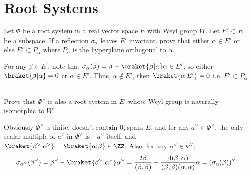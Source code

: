 \documentclass[11pt, headheight=30pt]{scrartcl}
\begin{document}






\section{Root Systems}
\begin{prob}
    Let $\Phi$ be a root system in a real vector space $E$ with Weyl group $W$.
    Let $E' \subset E$ be a subspace. If a reflection $\sigma_\alpha$ leaves $E'$ invariant, prove that either
    $\alpha \in E'$ or else $E' \subset P_\alpha$ where $P_\alpha$ is the hyperplane orthogonal to $\alpha$.
\end{prob}
For any $\beta \in E'$, note that $\sigma_\alpha(\beta) = \beta - \braket{\beta | \alpha}\alpha\in E'$,
so either $\braket{\beta | \alpha} = 0$ or $\alpha\in E'$. Thus, $\alpha\not\in E'$,
then $\braket{\alpha|E'} = 0$ i.e. $E'\subset P_\alpha$.
\begin{prob}
    Prove that $\Phi^\vee$ is also a root system in $E$, whose Weyl group is naturally isomorphic
    to $W$.
\end{prob}
Obviously $\Phi^\vee$ is finite, doesn't contain $0$, spans $E$, and for any $a^\vee\in \Phi^\vee$,
the only scalar multiple of $a^\vee$ in $\Phi^\vee$ is $-a^\vee$ itself, and $\braket{\beta^\vee | \alpha^\vee} = \braket{\alpha | \beta}\in \ZZ$.
Also,
for any $\alpha^\vee\in \Phi^\vee$,
\[
    \sigma_{\alpha^\vee}(\beta^\vee) = \beta^\vee - \braket{\beta^\vee | \alpha^\vee}\alpha^\vee = \frac{2\beta}{(\beta, \beta)} - \frac{4(\beta, \alpha)}{(\beta,\beta)(\alpha,\alpha)}\alpha = \left(\sigma_\alpha(\beta)\right)^\vee
\]
\end{document}
